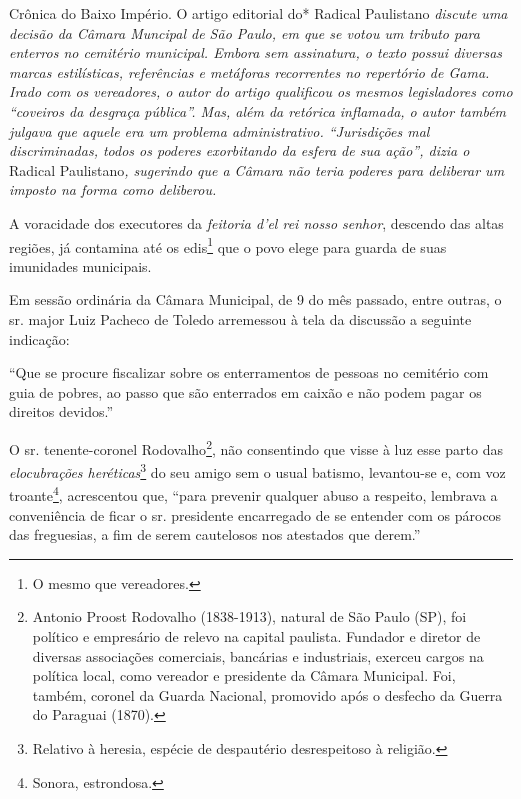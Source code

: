 \begin{didascalia}
Crônica do Baixo Império. O artigo editorial do* Radical Paulistano
\emph{discute uma decisão da Câmara Muncipal de São Paulo, em que se
votou um tributo para enterros no cemitério municipal. Embora sem
assinatura, o texto possui diversas marcas estilísticas, referências e
metáforas recorrentes no repertório de Gama. Irado com os vereadores, o
autor do artigo qualificou os mesmos legisladores como ``coveiros da
desgraça pública''. Mas, além da retórica inflamada, o autor também
julgava que aquele era um problema administrativo. ``Jurisdições mal
discriminadas, todos os poderes exorbitando da esfera de sua ação'',
dizia o} Radical Paulistano\emph{, sugerindo que a Câmara não teria
poderes para deliberar um imposto na forma como deliberou.}
\end{didascalia}

\asterisc{}

A voracidade dos executores da \emph{feitoria d'el rei nosso senhor},
descendo das altas regiões, já contamina até os edis\footnote{O mesmo
  que vereadores.} que o povo elege para guarda de suas imunidades
municipais.

Em sessão ordinária da Câmara Municipal, de 9 do mês passado, entre
outras, o sr. major Luiz Pacheco de Toledo arremessou à tela da
discussão a seguinte indicação:

``Que se procure fiscalizar sobre os enterramentos de pessoas no
cemitério com guia de pobres, ao passo que são enterrados em caixão e
não podem pagar os direitos devidos.''

O sr. tenente-coronel Rodovalho\footnote{Antonio Proost Rodovalho
  (1838-1913), natural de São Paulo (SP), foi político e empresário de
  relevo na capital paulista. Fundador e diretor de diversas associações
  comerciais, bancárias e industriais, exerceu cargos na política local,
  como vereador e presidente da Câmara Municipal. Foi, também, coronel
  da Guarda Nacional, promovido após o desfecho da Guerra do Paraguai
  (1870).}, não consentindo que visse à luz esse parto das
\emph{elocubrações heréticas}\footnote{Relativo à heresia, espécie de
  despautério desrespeitoso à religião.} do seu amigo sem o usual
batismo, levantou-se e, com voz troante\footnote{Sonora, estrondosa.},
acrescentou que, ``para prevenir qualquer abuso a respeito, lembrava a
conveniência de ficar o sr. presidente encarregado de se entender com os
párocos das freguesias, a fim de serem cautelosos nos atestados que
derem.''


